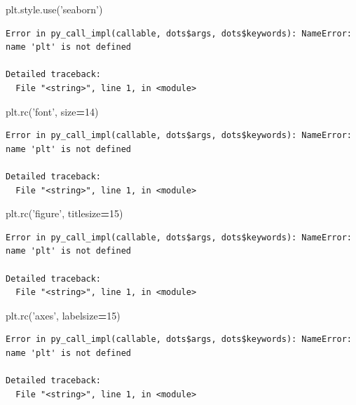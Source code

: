 \documentclass[]{book}
\newenvironment{Shaded}{\begin{snugshade}}{\end{snugshade}}
\newcommand{\DecValTok}[1]{\textcolor[rgb]{0.00,0.00,0.81}{#1}}
\newcommand{\NormalTok}[1]{#1}
\newcommand{\OperatorTok}[1]{\textcolor[rgb]{0.81,0.36,0.00}{\textbf{#1}}}
\newcommand{\StringTok}[1]{\textcolor[rgb]{0.31,0.60,0.02}{#1}}
\begin{document}
\begin{Shaded}
\begin{Highlighting}[]
\NormalTok{plt.style.use(}\StringTok{'seaborn'}\NormalTok{)}
\end{Highlighting}
\end{Shaded}

\begin{verbatim}
Error in py_call_impl(callable, dots$args, dots$keywords): NameError: name 'plt' is not defined

Detailed traceback: 
  File "<string>", line 1, in <module>
\end{verbatim}

\begin{Shaded}
\begin{Highlighting}[]
\NormalTok{plt.rc(}\StringTok{'font'}\NormalTok{, size}\OperatorTok{=}\DecValTok{14}\NormalTok{)}
\end{Highlighting}
\end{Shaded}

\begin{verbatim}
Error in py_call_impl(callable, dots$args, dots$keywords): NameError: name 'plt' is not defined

Detailed traceback: 
  File "<string>", line 1, in <module>
\end{verbatim}

\begin{Shaded}
\begin{Highlighting}[]
\NormalTok{plt.rc(}\StringTok{'figure'}\NormalTok{, titlesize}\OperatorTok{=}\DecValTok{15}\NormalTok{)}
\end{Highlighting}
\end{Shaded}

\begin{verbatim}
Error in py_call_impl(callable, dots$args, dots$keywords): NameError: name 'plt' is not defined

Detailed traceback: 
  File "<string>", line 1, in <module>
\end{verbatim}

\begin{Shaded}
\begin{Highlighting}[]
\NormalTok{plt.rc(}\StringTok{'axes'}\NormalTok{, labelsize}\OperatorTok{=}\DecValTok{15}\NormalTok{)}
\end{Highlighting}
\end{Shaded}

\begin{verbatim}
Error in py_call_impl(callable, dots$args, dots$keywords): NameError: name 'plt' is not defined

Detailed traceback: 
  File "<string>", line 1, in <module>
\end{verbatim}
\end{document}

